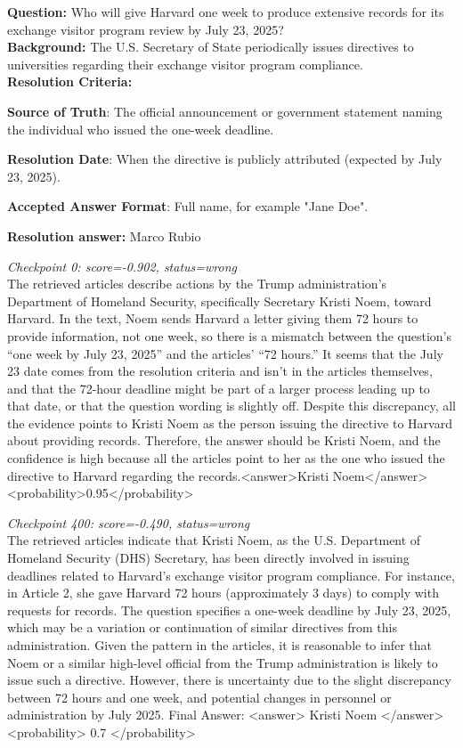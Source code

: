 \documentclass{article} %
\begin{document}
\noindent\textbf{Question:} Who will give Harvard one week to produce extensive records for its exchange visitor program review by July 23, 2025? \\
\noindent\textbf{Background:} The U.S. Secretary of State periodically issues directives to universities regarding their exchange visitor program compliance.\\
\noindent\textbf{Resolution Criteria:}

\textbf{Source of Truth}: The official announcement or government statement naming the individual who issued the one-week deadline.

\textbf{Resolution Date}: When the directive is publicly attributed (expected by July 23, 2025).

\textbf{Accepted Answer Format}: Full name, for example "Jane Doe".

\noindent\textbf{Resolution answer:} Marco Rubio

\medskip

\noindent\textit{Checkpoint 0: score=-0.902, status=wrong}\\
The retrieved articles describe actions by the Trump administration's Department of Homeland Security, specifically Secretary Kristi Noem, toward Harvard. In the text, Noem sends Harvard a letter giving them 72 hours to provide information, not one week, so there is a mismatch between the question's ``one week by July 23, 2025'' and the articles' ``72 hours.'' It seems that the July 23 date comes from the resolution criteria and isn't in the articles themselves, and that the 72-hour deadline might be part of a larger process leading up to that date, or that the question wording is slightly off. Despite this discrepancy, all the evidence points to Kristi Noem as the person issuing the directive to Harvard about providing records. Therefore, the answer should be Kristi Noem, and the confidence is high because all the articles point to her as the one who issued the directive to Harvard regarding the records.<answer>Kristi Noem</answer> <probability>0.95</probability>

\medskip

\noindent\textit{Checkpoint 400: score=-0.490, status=wrong}\\
The retrieved articles indicate that Kristi Noem, as the U.S. Department of Homeland Security (DHS) Secretary, has been directly involved in issuing deadlines related to Harvard's exchange visitor program compliance. For instance, in Article 2, she gave Harvard 72 hours (approximately 3 days) to comply with requests for records. The question specifies a one-week deadline by July 23, 2025, which may be a variation or continuation of similar directives from this administration. Given the pattern in the articles, it is reasonable to infer that Noem or a similar high-level official from the Trump administration is likely to issue such a directive. However, there is uncertainty due to the slight discrepancy between 72 hours and one week, and potential changes in personnel or administration by July 2025. Final Answer: <answer> Kristi Noem </answer> <probability> 0.7 </probability>
\end{document}
